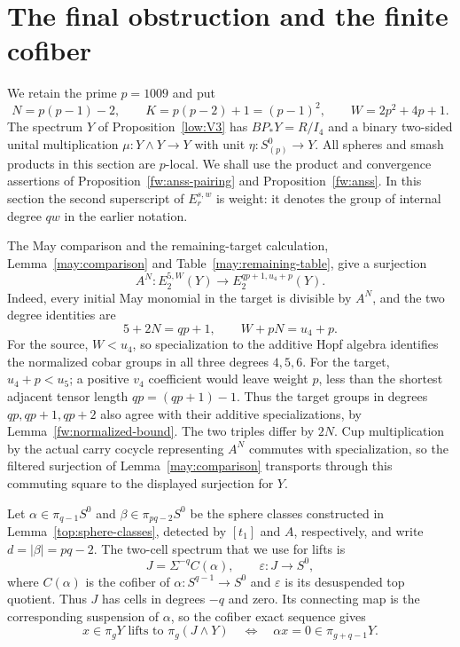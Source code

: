 \section{The final obstruction and the finite cofiber}
\label{top:section}

We retain the prime $p=1009$ and put
\begin{equation}
\label{top:constants}
 N=p(p-1)-2,\qquad K=p(p-2)+1=(p-1)^2,
 \qquad W=2p^2+4p+1.
\end{equation}
The spectrum $Y$ of Proposition~\ref{low:V3} has
$BP_*Y=R/I_4$ and a binary two-sided unital multiplication
$\mu:Y\wedge Y\longrightarrow Y$ with unit $\eta:S^0_{(p)}\to Y$.
All spheres and smash products in this section are $p$-local.
We shall use the product and convergence assertions of
Proposition~\ref{fw:anss-pairing} and Proposition~\ref{fw:anss}.
In this section the second superscript of $E_r^{s,w}$ is weight:
it denotes the group of internal degree $qw$ in the earlier notation.

The May comparison and the remaining-target calculation,
Lemma~\ref{may:comparison} and Table~\ref{may:remaining-table},
give a surjection
\begin{equation}
\label{top:An-surjection}
 A^N\colon E_2^{5,W}(Y)\longrightarrow
 E_2^{qp+1,u_4+p}(Y).
\end{equation}
Indeed, every initial May monomial in the target is divisible by
$A^N$, and the two degree identities are
\[
 5+2N=qp+1,\qquad W+pN=u_4+p.
\]
For the source, $W<u_4$, so specialization to the additive Hopf
algebra identifies the normalized cobar groups in all three degrees
$4,5,6$. For the target, $u_4+p<u_5$; a positive $v_4$ coefficient
would leave weight $p$, less than the shortest adjacent tensor length
$qp=(qp+1)-1$. Thus the target groups in degrees $qp,qp+1,qp+2$
also agree with their additive specializations, by
Lemma~\ref{fw:normalized-bound}. The two triples differ by $2N$.
Cup multiplication by the actual carry cocycle representing $A^N$
commutes with specialization, so the filtered surjection of
Lemma~\ref{may:comparison} transports through this commuting square
to the displayed surjection for $Y$.

Let $\alpha\in\pi_{q-1}S^0$ and
$\beta\in\pi_{pq-2}S^0$ be the sphere classes constructed in
Lemma~\ref{top:sphere-classes}, detected by $[t_1]$ and $A$,
respectively, and write $d=|\beta|=pq-2$.
The two-cell spectrum that we use for lifts is
\begin{equation}
\label{top:J-definition}
 J=\Sigma^{-q}C(\alpha),\qquad
 \varepsilon:J\longrightarrow S^0,
\end{equation}
where $C(\alpha)$ is the cofiber of $\alpha:S^{q-1}\to S^0$
and $\varepsilon$ is its desuspended top quotient. Thus $J$ has
cells in degrees $-q$ and zero. Its connecting map is the corresponding
suspension of $\alpha$, so the cofiber exact sequence gives
\begin{equation}
\label{top:lift-criterion}
 x\in\pi_gY\text{ lifts to }\pi_g(J\wedge Y)
 \quad\Longleftrightarrow\quad
 \alpha x=0\in\pi_{g+q-1}Y.
\end{equation}

